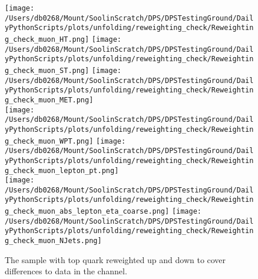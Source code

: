 \begin{figure*}[hp]
	\centering
	\texttt{[image: /Users/db0268/Mount/SoolinScratch/DPS/DPSTestingGround/DailyPythonScripts/plots/unfolding/reweighting\_check/Reweighting\_check\_muon\_HT.png]} 
	\texttt{[image: /Users/db0268/Mount/SoolinScratch/DPS/DPSTestingGround/DailyPythonScripts/plots/unfolding/reweighting\_check/Reweighting\_check\_muon\_ST.png]} 
	\texttt{[image: /Users/db0268/Mount/SoolinScratch/DPS/DPSTestingGround/DailyPythonScripts/plots/unfolding/reweighting\_check/Reweighting\_check\_muon\_MET.png]} \\
	\texttt{[image: /Users/db0268/Mount/SoolinScratch/DPS/DPSTestingGround/DailyPythonScripts/plots/unfolding/reweighting\_check/Reweighting\_check\_muon\_WPT.png]} 
	\texttt{[image: /Users/db0268/Mount/SoolinScratch/DPS/DPSTestingGround/DailyPythonScripts/plots/unfolding/reweighting\_check/Reweighting\_check\_muon\_lepton\_pt.png]} \\
	\texttt{[image: /Users/db0268/Mount/SoolinScratch/DPS/DPSTestingGround/DailyPythonScripts/plots/unfolding/reweighting\_check/Reweighting\_check\_muon\_abs\_lepton\_eta\_coarse.png]}
	\texttt{[image: /Users/db0268/Mount/SoolinScratch/DPS/DPSTestingGround/DailyPythonScripts/plots/unfolding/reweighting\_check/Reweighting\_check\_muon\_NJets.png]}
	\caption[The \powhegpythia{} sample with top quark \pt{} reweighted up and down to cover differences to data in the \musJets{} channel.]{The \powhegpythia{} sample with top quark \pt{} reweighted up and down to cover differences to data in the \musJets{} channel.}
	\label{fig:Reweightingsmu}
\end{figure*}